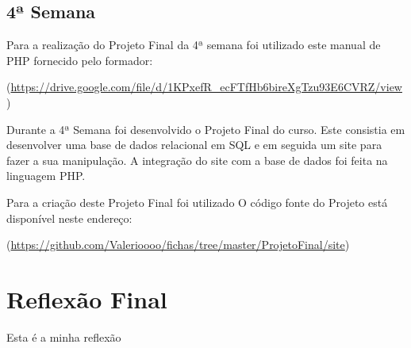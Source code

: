 \documentclass[14pt]{article}
\begin{document}
\subsection{4ª Semana}

Para a realização do Projeto Final da 4ª semana foi utilizado este manual de PHP fornecido pelo formador:

(\url{https://drive.google.com/file/d/1KPxefR_ecFTfHb6bireXgTzu93E6CVRZ/view})

Durante a 4ª Semana foi desenvolvido o Projeto Final do curso.
Este consistia em desenvolver uma base de dados relacional em SQL e em seguida um site para fazer a sua manipulação.
A integração do site com a base de dados foi feita na linguagem PHP.

Para a criação deste Projeto Final foi utilizado
O código fonte do Projeto está disponível neste endereço:

(\url{https://github.com/Valerioooo/fichas/tree/master/ProjetoFinal/site})


\section{Reflexão Final}
Esta é a minha reflexão
\end{document}
